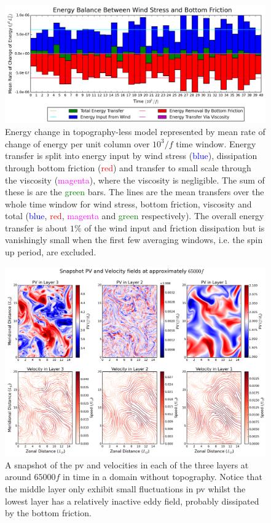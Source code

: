 \documentclass[12pt,a4paper]{report}
\begin{document}
  \begin{figure}[t]
  	\centering
  	\includegraphics[width=\linewidth]{notopenergy}
  	\caption{Energy change in topography-less model represented by mean rate of change of energy per unit column over $10^{3}/f$ time window. Energy transfer is split into 
  		energy input by wind stress (\textcolor{blue}{blue}), dissipation through bottom friction (\textcolor{red}{red}) and transfer to small scale through the viscosity
  		(\textcolor{magenta}{magenta}), where the viscosity is negligible. The sum of these
  		is are the \textcolor{green}{green} bars. The lines are the mean transfers over the whole time window for wind stress, bottom friction, viscosity and total (\textcolor{blue}{blue}, \textcolor{red}{red}, \textcolor{magenta}{magenta} and \textcolor{green}{green} respectively). The overall energy transfer is about $1\%$
  		of the wind input and friction dissipation but is vanishingly small when the first
  		few averaging windows, i.e. the spin up period, are excluded.}
  	\label{fig:notopenergy}
  \end{figure}
  
  
  
  \begin{figure}
  	\centering
  	\includegraphics[width=0.8\linewidth]{notoppv}
  	\caption{ A snapshot of the \gls{pv} and velocities in each of the three layers
  		at around $65000 f$ in time in a domain without topography. Notice
  		that the middle layer only exhibit small fluctuations in \gls{pv} whilst
  		the lowest layer has a relatively inactive eddy field, probably dissipated by the
  		bottom friction.}
  	\label{fig:notoppv}
  \end{figure}
  
\end{document}
